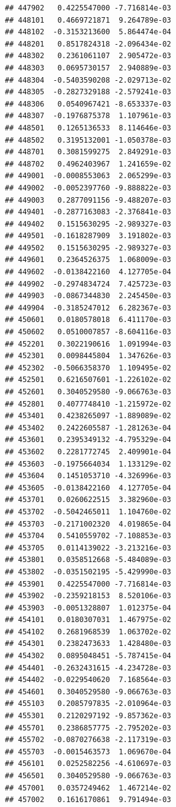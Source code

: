\documentclass[ignorenonframetext,]{beamer}
\begin{document}
\begin{frame}[fragile]
\begin{verbatim}
## 447902   0.4225547000 -7.716814e-03
## 448101   0.4669721871  9.264789e-03
## 448102  -0.3153213600  5.864474e-04
## 448201   0.8517824318 -2.096434e-02
## 448302   0.2361061107  2.905472e-03
## 448303   0.0695730157  2.940889e-03
## 448304  -0.5403590208 -2.029713e-02
## 448305  -0.2827329188 -2.579241e-03
## 448306   0.0540967421 -8.653337e-03
## 448307  -0.1976875378  1.107961e-03
## 448501   0.1265136533  8.114646e-03
## 448502   0.3195132001 -1.050378e-03
## 448701   0.3081599275  2.849291e-03
## 448702   0.4962403967  1.241659e-02
## 449001  -0.0008553063  2.065299e-03
## 449002  -0.0052397760 -9.888822e-03
## 449003   0.2877091156 -9.488207e-03
## 449401  -0.2877163083 -2.376841e-03
## 449402   0.1515630295 -2.989327e-03
## 449501  -0.1618287909  3.191802e-03
## 449502   0.1515630295 -2.989327e-03
## 449601   0.2364526375  1.068009e-03
## 449602  -0.0138422160  4.127705e-04
## 449902  -0.2974834724  7.425723e-03
## 449903  -0.0867344830  2.245450e-03
## 449904  -0.3185247012  6.282367e-03
## 450601   0.0180578018  6.411170e-03
## 450602   0.0510007857 -8.604116e-03
## 452201   0.3022190616  1.091994e-03
## 452301   0.0098445804  1.347626e-03
## 452302  -0.5066358370  1.109495e-02
## 452501   0.6216507601 -1.226102e-02
## 452601   0.3040529580 -9.066763e-03
## 452801   0.4077748410 -1.215972e-02
## 453401   0.4238265097 -1.889089e-02
## 453402   0.2422605587 -1.281263e-04
## 453601   0.2395349132 -4.795329e-04
## 453602   0.2281772745  2.409901e-04
## 453603  -0.1975664034  1.133129e-02
## 453604   0.1451053710 -4.326996e-03
## 453605  -0.0138422160  4.127705e-04
## 453701   0.0260622515  3.382960e-03
## 453702  -0.5042465011  1.104760e-02
## 453703  -0.2171002320  4.019865e-04
## 453704   0.5410559702 -7.108853e-03
## 453705   0.0114139022 -3.213216e-03
## 453801   0.0358512668 -5.484089e-03
## 453802  -0.0351502195 -5.429990e-03
## 453901   0.4225547000 -7.716814e-03
## 453902  -0.2359218153  8.520106e-03
## 453903  -0.0051328807  1.012375e-04
## 454101   0.0180307031  1.467975e-02
## 454102   0.2681968539  1.063702e-02
## 454301   0.2382473633  1.428480e-03
## 454302   0.0895048451 -5.787415e-04
## 454401  -0.2632431615 -4.234728e-03
## 454402  -0.0229540620  7.168564e-03
## 454601   0.3040529580 -9.066763e-03
## 455103   0.2085797835 -2.010964e-03
## 455301   0.2120297192 -9.857362e-03
## 455701   0.2386857775 -2.795202e-03
## 455702  -0.0870276638 -2.117319e-03
## 455703  -0.0015463573  1.069670e-04
## 456101   0.0252582256 -4.610697e-03
## 456501   0.3040529580 -9.066763e-03
## 457001   0.0357249462  1.467214e-02
## 457002   0.1616170861  9.791494e-03

\end{verbatim}
\end{frame}
\end{document}
